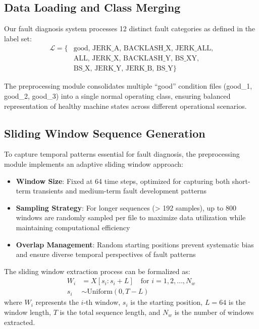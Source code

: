 \subsection{Data Loading and Class Merging}
\label{subsec:data_loading}

Our fault diagnosis system processes 12 distinct fault categories as defined in the label set:
\begin{align}
\mathcal{L} = \{&\text{good, JERK\_A, BACKLASH\_X, JERK\_ALL,} \nonumber \\
&\text{ALL, JERK\_X, BACKLASH\_Y, BS\_XY,} \nonumber \\
&\text{BS\_X, JERK\_Y, JERK\_B, BS\_Y}\}
\end{align}

The preprocessing module consolidates multiple ``good'' condition files (good\_1, good\_2, good\_3) into a single normal operating class, ensuring balanced representation of healthy machine states across different operational scenarios.

\subsection{Sliding Window Sequence Generation}
\label{subsec:sliding_window}

To capture temporal patterns essential for fault diagnosis, the preprocessing module implements an adaptive sliding window approach:

\begin{itemize}
    \item \textbf{Window Size}: Fixed at 64 time steps, optimized for capturing both short-term transients and medium-term fault development patterns
    \item \textbf{Sampling Strategy}: For longer sequences (> 192 samples), up to 800 windows are randomly sampled per file to maximize data utilization while maintaining computational efficiency
    \item \textbf{Overlap Management}: Random starting positions prevent systematic bias and ensure diverse temporal perspectives of fault patterns
\end{itemize}

The sliding window extraction process can be formalized as:
\begin{align}
W_i &= X[s_i : s_i + L] \quad \text{for } i = 1, 2, \ldots, N_w \\
s_i &\sim \text{Uniform}(0, T - L)
\end{align}
where $W_i$ represents the $i$-th window, $s_i$ is the starting position, $L = 64$ is the window length, $T$ is the total sequence length, and $N_w$ is the number of windows extracted.

